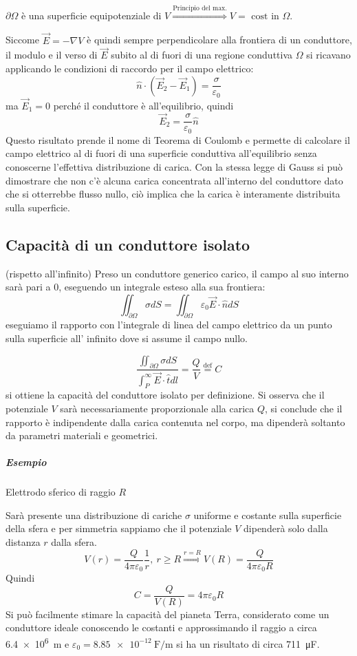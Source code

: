 $\partial \Omega$ è una superficie equipotenziale di $V \stackrel{\text{Principio del max.}}{\Rightarrow} V = \text{ cost in } \Omega$.

Siccome $\vec{E} = -\nabla V$ è quindi sempre perpendicolare alla frontiera di un conduttore,
il modulo e il verso di $\vec{E}$ subito al di fuori di una regione conduttiva $\Omega$ 
si ricavano applicando le condizioni di raccordo per il campo elettrico:
$$
\hat{n}\cdot (\vec{E}_2-\vec{E}_1) = \frac{\sigma}{\varepsilon_0}
$$
ma $\vec{E}_1 = 0$ perché il conduttore è all'equilibrio, quindi 
$$
\vec{E}_2 = \frac{\sigma}{\varepsilon_0} \hat{n}
$$
Questo risultato prende il nome di Teorema di Coulomb e permette di calcolare il campo elettrico al 
di fuori di una superficie conduttiva all'equilibrio senza conoscerne l'effettiva distribuzione di 
carica.
Con la stessa legge di Gauss si può dimostrare che non c'è alcuna carica concentrata all'interno
del conduttore dato che si otterrebbe flusso nullo, ciò implica che la carica è interamente
distribuita sulla superficie.

\subsection{Capacità di un conduttore isolato} (rispetto all'infinito)
Preso un conduttore generico carico, il campo al suo interno sarà pari a 0, eseguendo un integrale
esteso alla sua frontiera:
$$
\iint_{\partial \Omega}\sigma dS = \iint_{\partial \Omega} \varepsilon_0 \vec{E}\cdot \hat{n} dS
$$
eseguiamo il rapporto con l'integrale di linea del campo elettrico da un punto sulla superficie all'
infinito dove si assume il campo nullo.

$$
\frac{\iint_{\partial \Omega}\sigma dS }{\int_P^\infty \vec{E}\cdot\hat{t}dl } = \frac{Q}{V} \stackrel{\text{def}}{=} C
$$
si ottiene la capacità del conduttore isolato per definizione.
Si osserva che il potenziale $V$ sarà necessariamente proporzionale alla carica $Q$, si 
conclude che il rapporto è indipendente dalla carica contenuta nel corpo, ma dipenderà soltanto da
parametri materiali e geometrici.
\subparagraph{Esempio}
Elettrodo sferico di raggio $R$

Sarà presente una distribuzione di cariche $\sigma$ uniforme e costante sulla superficie della sfera
e per simmetria sappiamo che il potenziale $V$ dipenderà solo dalla distanza $r$ dalla sfera.
$$
V(r) = \frac{Q}{4 \pi \varepsilon_0}\frac{1}{r},\ r\geq R \stackrel{r=R}{\Rightarrow} V(R) = 
\frac{Q}{4\pi\varepsilon_0 R}
$$
Quindi 
$$
C = \frac{Q}{V(R)} = 4\pi\varepsilon_0 R
$$
Si può facilmente stimare la capacità del pianeta Terra, considerato come un conduttore ideale
conoscendo le costanti e approssimando il raggio a circa \SI{6.4e6}{\meter} e $\varepsilon_0 = 
\SI{8.85e-12}{\farad\per\meter}$ si ha un risultato di circa \SI{711}{\micro\farad}.

